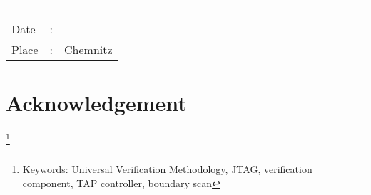 \documentclass[a4paper,11pt]{article}
\begin{document}
\vfill
\begin{minipage}[t]{0.3\textwidth}%
\begin{tabular}{lcc}
 &  & \tabularnewline
 &  & \tabularnewline
 &  & \tabularnewline
Date & : & \tabularnewline
Place &: & Chemnitz\tabularnewline
\end{tabular}%

\end{minipage}

\pagebreak
\section*{\LARGE{Acknowledgement}}

%
%
\newpage

\begin{abstract}
A verification component is designed for a device with a JTAG interface. We have selected a full adder module with JTAG capability as our device under test. The instructions of Idcode, Bypass, Sample/Preload and Intest are implemented. All the implemented instructions are IEEE 1149.1 standard compliant. This verification component is designed with the use of the Universal Verification Methodology. Using the modules of the UVM environment, we have given the DUT a set of constrained stimulus and observed the response. The designed VC has the capability to introduce errors to understand how the VC would react to runtime errors. The errors, if any, are printed out on the console. This VC gives us an advantage of reusability wherein this full adder module can be replaced by any other module and the tests can be repeated with little effort. In this project we have designed the advanced DUTs with JTAG capability and verification environment, tested the working of the JTAG instructions and finally compared the expected data with the one that is actually observed. \\
\end{abstract}
\footnote{Keywords: Universal Verification Methodology, JTAG, verification component, TAP controller, boundary scan}


\newpage
\tableofcontents

\newpage
\end{document}
